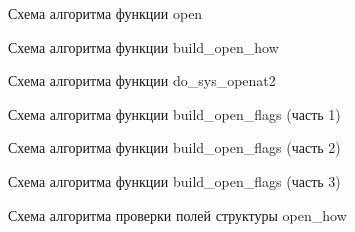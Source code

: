 
\vspace*{\fill}
\begin{figure}[h]
    \centering
    \def\svgwidth{0.8\textwidth}
    
    \caption{Схема алгоритма функции open}
\end{figure}
\vfill

\clearpage

\vspace*{\fill}
\begin{figure}[h]
    \centering
    \def\svgwidth{1\textwidth}
    
    \caption{Схема алгоритма функции build\_open\_how}
\end{figure}
\vfill

\clearpage

\vspace*{\fill}
\begin{figure}[h]
    \centering
    \def\svgwidth{1\textwidth}
    
    \caption{Схема алгоритма функции do\_sys\_openat2}
\end{figure}
\vfill

\clearpage

\vspace*{\fill}
\begin{figure}[h]
    \centering
    \def\svgwidth{0.9\textwidth}
    
    \caption{Схема алгоритма функции build\_open\_flags (часть 1)}
\end{figure}
\vfill

\clearpage

\vspace*{\fill}
\begin{figure}[h]
    \centering
    \def\svgwidth{0.8\textwidth}
    
    \caption{Схема алгоритма функции build\_open\_flags (часть 2)}
\end{figure}
\vfill

\clearpage

\vspace*{\fill}
\begin{figure}[h]
    \centering
    \def\svgwidth{0.67\textwidth}
    
    \caption{Схема алгоритма функции build\_open\_flags (часть 3)}
\end{figure}
\vfill

\clearpage

\vspace*{\fill}
\begin{figure}[h]
    \centering
    \def\svgwidth{0.45\textwidth}
    
    \caption{Схема алгоритма проверки полей структуры open\_how}
\end{figure}
\vfill

